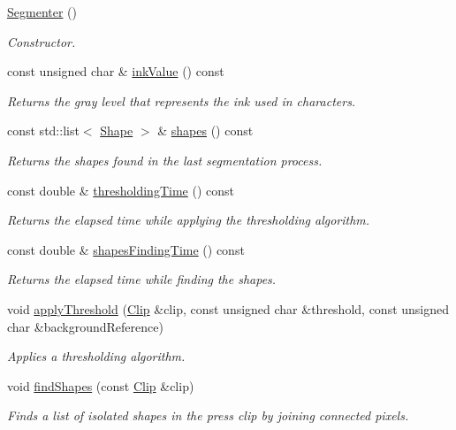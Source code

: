 \begin{CompactItemize}
\item 
\hyperlink{class_segmenter_d39ec3bda31be180820aa0bdca7b125d}{Segmenter} ()
\begin{CompactList}\small\item\em Constructor. \item\end{CompactList}\item 
const unsigned char \& \hyperlink{class_segmenter_e9bc56ddcbe5ea4abb40fcc85e3d9fbe}{inkValue} () const 
\begin{CompactList}\small\item\em Returns the gray level that represents the ink used in characters. \item\end{CompactList}\item 
const std::list$<$ \hyperlink{class_shape}{Shape} $>$ \& \hyperlink{class_segmenter_7ddded12f26e94e6f5cba2752d2c4142}{shapes} () const 
\begin{CompactList}\small\item\em Returns the shapes found in the last segmentation process. \item\end{CompactList}\item 
const double \& \hyperlink{class_segmenter_52f771c61d667df4f552ee73dc9f22e7}{thresholdingTime} () const 
\begin{CompactList}\small\item\em Returns the elapsed time while applying the thresholding algorithm. \item\end{CompactList}\item 
const double \& \hyperlink{class_segmenter_53761a65661587c45e34988b90401888}{shapesFindingTime} () const 
\begin{CompactList}\small\item\em Returns the elapsed time while finding the shapes. \item\end{CompactList}\item 
void \hyperlink{class_segmenter_6854315e3320f9d9a8ece14cbb8570ee}{applyThreshold} (\hyperlink{class_clip}{Clip} \&clip, const unsigned char \&threshold, const unsigned char \&backgroundReference)
\begin{CompactList}\small\item\em Applies a thresholding algorithm. \item\end{CompactList}\item 
void \hyperlink{class_segmenter_465c8e755bb56d247add080a04377520}{findShapes} (const \hyperlink{class_clip}{Clip} \&clip)
\begin{CompactList}\small\item\em Finds a list of isolated shapes in the press clip by joining connected pixels. \item\end{CompactList}\end{CompactItemize}
